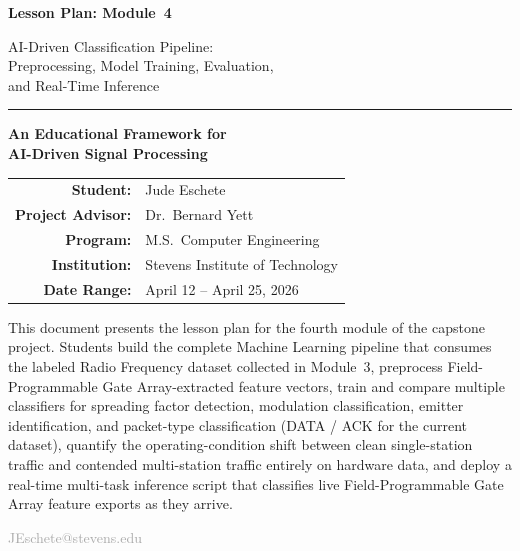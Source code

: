 \documentclass[11pt,letterpaper]{article}
\begin{document}
	\begin{titlepage}
		\centering
		\vspace*{2cm}

		{\Huge\bfseries\color{stevens} Lesson Plan: Module~4\par}
		\vspace{0.5cm}
		{\LARGE\color{darkgray} AI-Driven Classification Pipeline:\\[4pt]
			Preprocessing, Model Training, Evaluation,\\[4pt]
			and Real-Time Inference\par}

		\vspace{1.5cm}
		\rule{0.6\textwidth}{1pt}
		\vspace{1.5cm}

		{\Large\textbf{An Educational Framework for\\[4pt]
				AI-Driven Signal Processing}\par}

		\vspace{1.5cm}

		\begin{tabular}{rl}
			\textbf{Student:}         & Jude Eschete \\
			\textbf{Project Advisor:} & Dr.\ Bernard Yett \\
			\textbf{Program:}         & M.S.\ Computer Engineering \\
			\textbf{Institution:}     & Stevens Institute of Technology \\
			\textbf{Date Range:}      & April 12 -- April 25, 2026 \\
		\end{tabular}

		\vspace{2cm}

		\begin{tcolorbox}[colback=lightgray, colframe=darkgray, width=0.85\textwidth, arc=2pt]
			\centering\small
			This document presents the lesson plan for the fourth module of the capstone project.
			Students build the complete Machine Learning pipeline that consumes the labeled Radio Frequency
			dataset collected in Module~3, preprocess Field-Programmable Gate Array-extracted feature vectors, train and
			compare multiple classifiers for spreading factor detection, modulation classification, emitter
			identification, and packet-type classification (DATA / ACK for the current dataset), quantify the operating-condition
			shift between clean single-station traffic and contended multi-station traffic
			entirely on hardware data, and deploy a real-time multi-task inference script that classifies
			live Field-Programmable Gate Array feature exports as they arrive.
		\end{tcolorbox}

		\vfill
		{\small\textcolor{darkgray}{JEschete@stevens.edu}}
	\end{titlepage}
\end{document}
